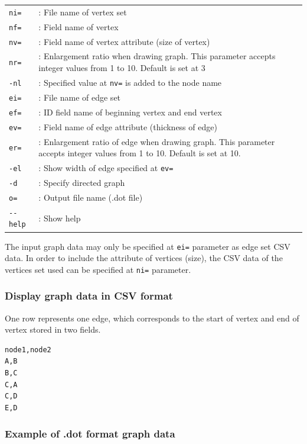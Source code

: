 \begin{table}[htbp]
{\small
\begin{tabular}{ll}
\verb|ni=| & : File name of vertex set \\
\verb|nf=| & : Field name of vertex  \\
\verb|nv=| & : Field name of vertex attribute (size of vertex)   \\
\verb|nr=| & : Enlargement ratio when drawing graph. This parameter accepts integer values from 1 to 10. Default is set at 3 \\
\verb|-nl| & : Specified value at \verb|nv=| is added to the node name  \\
\verb|ei=| & : File name of edge set  \\
\verb|ef=| & : ID field name of beginning vertex and end vertex  \\
\verb|ev=| & : Field name of edge attribute (thickness of edge)  \\
\verb|er=| & : Enlargement ratio of edge when drawing graph. This parameter accepts integer values from 1 to 10. Default is set at 10.  \\
\verb|-el| & : Show width of edge specified at  \verb|ev=|  \\
\verb|-d|  & : Specify directed graph   \\
\verb|o=|  & : Output file name (.dot file)   \\
\verb|--help| & : Show help  \\
\end{tabular} 
}
\end{table} 


The input graph data may only be specified  at \verb|ei=| parameter as edge set CSV data.  
In order to include the attribute of vertices (size), the CSV data of the vertices set used can be specified at \verb|ni=| parameter.  


\subsubsection*{Display graph data in CSV format }

One row represents one edge, which corresponds to the start of vertex and end of vertex stored in two fields. 


\begin{Verbatim}[baselinestretch=0.7,frame=single]
node1,node2
A,B
B,C
C,A
C,D
E,D
\end{Verbatim}

\subsubsection*{Example of .dot format graph data}

